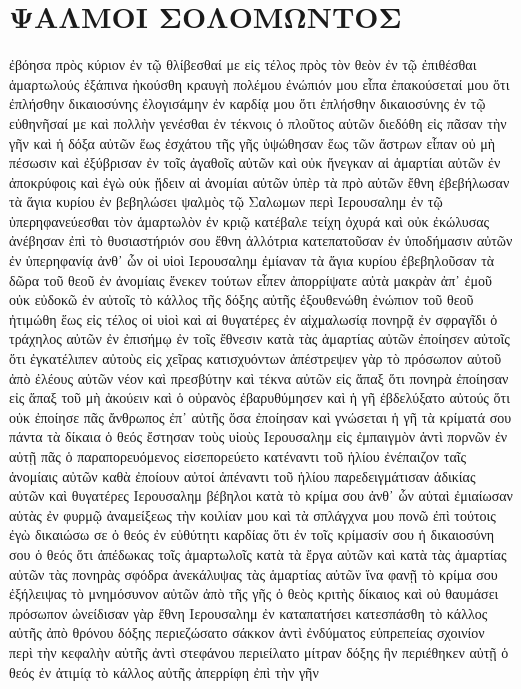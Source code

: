 \section{ΨΑΛΜΟΙ ΣΟΛΟΜΩΝΤΟΣ}
ἐβόησα πρὸς κύριον ἐν τῷ θλίβεσθαί με εἰς τέλος πρὸς τὸν θεὸν ἐν τῷ ἐπιθέσθαι ἁμαρτωλούς
ἐξάπινα ἠκούσθη κραυγὴ πολέμου ἐνώπιόν μου εἶπα ἐπακούσεταί μου ὅτι ἐπλήσθην δικαιοσύνης
ἐλογισάμην ἐν καρδίᾳ μου ὅτι ἐπλήσθην δικαιοσύνης ἐν τῷ εὐθηνῆσαί με καὶ πολλὴν γενέσθαι ἐν τέκνοις
ὁ πλοῦτος αὐτῶν διεδόθη εἰς πᾶσαν τὴν γῆν καὶ ἡ δόξα αὐτῶν ἕως ἐσχάτου τῆς γῆς
ὑψώθησαν ἕως τῶν ἄστρων εἶπαν οὐ μὴ πέσωσιν
καὶ ἐξύβρισαν ἐν τοῖς ἀγαθοῖς αὐτῶν καὶ οὐκ ἤνεγκαν
αἱ ἁμαρτίαι αὐτῶν ἐν ἀποκρύφοις καὶ ἐγὼ οὐκ ᾔδειν
αἱ ἀνομίαι αὐτῶν ὑπὲρ τὰ πρὸ αὐτῶν ἔθνη ἐβεβήλωσαν τὰ ἅγια κυρίου ἐν βεβηλώσει
ψαλμὸς τῷ Σαλωμων περὶ Ιερουσαλημ
ἐν τῷ ὑπερηφανεύεσθαι τὸν ἁμαρτωλὸν ἐν κριῷ κατέβαλε τείχη ὀχυρά καὶ οὐκ ἐκώλυσας
ἀνέβησαν ἐπὶ τὸ θυσιαστήριόν σου ἔθνη ἀλλότρια κατεπατοῦσαν ἐν ὑποδήμασιν αὐτῶν ἐν ὑπερηφανίᾳ
ἀνθ᾽ ὧν οἱ υἱοὶ Ιερουσαλημ ἐμίαναν τὰ ἅγια κυρίου ἐβεβηλοῦσαν τὰ δῶρα τοῦ θεοῦ ἐν ἀνομίαις
ἕνεκεν τούτων εἶπεν ἀπορρίψατε αὐτὰ μακρὰν ἀπ᾽ ἐμοῦ οὐκ εὐδοκῶ ἐν αὐτοῖς
τὸ κάλλος τῆς δόξης αὐτῆς ἐξουθενώθη ἐνώπιον τοῦ θεοῦ ἠτιμώθη ἕως εἰς τέλος
οἱ υἱοὶ καὶ αἱ θυγατέρες ἐν αἰχμαλωσίᾳ πονηρᾷ ἐν σφραγῖδι ὁ τράχηλος αὐτῶν ἐν ἐπισήμῳ ἐν τοῖς ἔθνεσιν
κατὰ τὰς ἁμαρτίας αὐτῶν ἐποίησεν αὐτοῖς ὅτι ἐγκατέλιπεν αὐτοὺς εἰς χεῖρας κατισχυόντων
ἀπέστρεψεν γὰρ τὸ πρόσωπον αὐτοῦ ἀπὸ ἐλέους αὐτῶν νέον καὶ πρεσβύτην καὶ τέκνα αὐτῶν εἰς ἅπαξ ὅτι πονηρὰ ἐποίησαν εἰς ἅπαξ τοῦ μὴ ἀκούειν
καὶ ὁ οὐρανὸς ἐβαρυθύμησεν καὶ ἡ γῆ ἐβδελύξατο αὐτούς ὅτι οὐκ ἐποίησε πᾶς ἄνθρωπος ἐπ᾽ αὐτῆς ὅσα ἐποίησαν
καὶ γνώσεται ἡ γῆ τὰ κρίματά σου πάντα τὰ δίκαια ὁ θεός
ἔστησαν τοὺς υἱοὺς Ιερουσαλημ εἰς ἐμπαιγμὸν ἀντὶ πορνῶν ἐν αὐτῇ πᾶς ὁ παραπορευόμενος εἰσεπορεύετο κατέναντι τοῦ ἡλίου
ἐνέπαιζον ταῖς ἀνομίαις αὐτῶν καθὰ ἐποίουν αὐτοί ἀπέναντι τοῦ ἡλίου παρεδειγμάτισαν ἀδικίας αὐτῶν
καὶ θυγατέρες Ιερουσαλημ βέβηλοι κατὰ τὸ κρίμα σου ἀνθ᾽ ὧν αὐταὶ ἐμιαίωσαν αὑτὰς ἐν φυρμῷ ἀναμείξεως
τὴν κοιλίαν μου καὶ τὰ σπλάγχνα μου πονῶ ἐπὶ τούτοις
ἐγὼ δικαιώσω σε ὁ θεός ἐν εὐθύτητι καρδίας ὅτι ἐν τοῖς κρίμασίν σου ἡ δικαιοσύνη σου ὁ θεός
ὅτι ἀπέδωκας τοῖς ἁμαρτωλοῖς κατὰ τὰ ἔργα αὐτῶν καὶ κατὰ τὰς ἁμαρτίας αὐτῶν τὰς πονηρὰς σφόδρα
ἀνεκάλυψας τὰς ἁμαρτίας αὐτῶν ἵνα φανῇ τὸ κρίμα σου ἐξήλειψας τὸ μνημόσυνον αὐτῶν ἀπὸ τῆς γῆς
ὁ θεὸς κριτὴς δίκαιος καὶ οὐ θαυμάσει πρόσωπον
ὠνείδισαν γὰρ ἔθνη Ιερουσαλημ ἐν καταπατήσει κατεσπάσθη τὸ κάλλος αὐτῆς ἀπὸ θρόνου δόξης
περιεζώσατο σάκκον ἀντὶ ἐνδύματος εὐπρεπείας σχοινίον περὶ τὴν κεφαλὴν αὐτῆς ἀντὶ στεφάνου
περιείλατο μίτραν δόξης ἣν περιέθηκεν αὐτῇ ὁ θεός ἐν ἀτιμίᾳ τὸ κάλλος αὐτῆς ἀπερρίφη ἐπὶ τὴν γῆν
